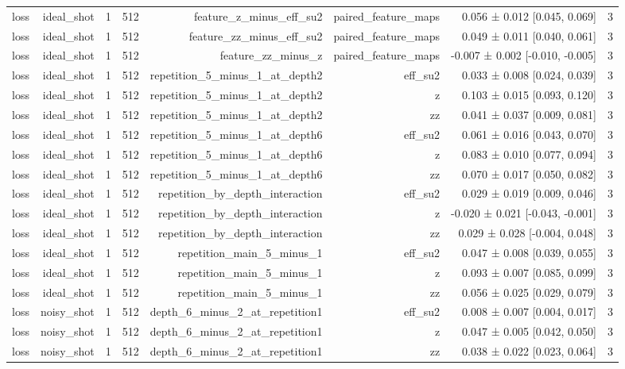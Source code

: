 \begin{table}
\begin{tabular}{lrrrrrrr}
loss & ideal\_shot & 1 & 512 & feature\_z\_minus\_eff\_su2 & paired\_feature\_maps & 0.056 ± 0.012 [0.045, 0.069] & 3 \\
loss & ideal\_shot & 1 & 512 & feature\_zz\_minus\_eff\_su2 & paired\_feature\_maps & 0.049 ± 0.011 [0.040, 0.061] & 3 \\
loss & ideal\_shot & 1 & 512 & feature\_zz\_minus\_z & paired\_feature\_maps & -0.007 ± 0.002 [-0.010, -0.005] & 3 \\
loss & ideal\_shot & 1 & 512 & repetition\_5\_minus\_1\_at\_depth2 & eff\_su2 & 0.033 ± 0.008 [0.024, 0.039] & 3 \\
loss & ideal\_shot & 1 & 512 & repetition\_5\_minus\_1\_at\_depth2 & z & 0.103 ± 0.015 [0.093, 0.120] & 3 \\
loss & ideal\_shot & 1 & 512 & repetition\_5\_minus\_1\_at\_depth2 & zz & 0.041 ± 0.037 [0.009, 0.081] & 3 \\
loss & ideal\_shot & 1 & 512 & repetition\_5\_minus\_1\_at\_depth6 & eff\_su2 & 0.061 ± 0.016 [0.043, 0.070] & 3 \\
loss & ideal\_shot & 1 & 512 & repetition\_5\_minus\_1\_at\_depth6 & z & 0.083 ± 0.010 [0.077, 0.094] & 3 \\
loss & ideal\_shot & 1 & 512 & repetition\_5\_minus\_1\_at\_depth6 & zz & 0.070 ± 0.017 [0.050, 0.082] & 3 \\
loss & ideal\_shot & 1 & 512 & repetition\_by\_depth\_interaction & eff\_su2 & 0.029 ± 0.019 [0.009, 0.046] & 3 \\
loss & ideal\_shot & 1 & 512 & repetition\_by\_depth\_interaction & z & -0.020 ± 0.021 [-0.043, -0.001] & 3 \\
loss & ideal\_shot & 1 & 512 & repetition\_by\_depth\_interaction & zz & 0.029 ± 0.028 [-0.004, 0.048] & 3 \\
loss & ideal\_shot & 1 & 512 & repetition\_main\_5\_minus\_1 & eff\_su2 & 0.047 ± 0.008 [0.039, 0.055] & 3 \\
loss & ideal\_shot & 1 & 512 & repetition\_main\_5\_minus\_1 & z & 0.093 ± 0.007 [0.085, 0.099] & 3 \\
loss & ideal\_shot & 1 & 512 & repetition\_main\_5\_minus\_1 & zz & 0.056 ± 0.025 [0.029, 0.079] & 3 \\
loss & noisy\_shot & 1 & 512 & depth\_6\_minus\_2\_at\_repetition1 & eff\_su2 & 0.008 ± 0.007 [0.004, 0.017] & 3 \\
loss & noisy\_shot & 1 & 512 & depth\_6\_minus\_2\_at\_repetition1 & z & 0.047 ± 0.005 [0.042, 0.050] & 3 \\
loss & noisy\_shot & 1 & 512 & depth\_6\_minus\_2\_at\_repetition1 & zz & 0.038 ± 0.022 [0.023, 0.064] & 3 \\

\end{tabular}
\end{table}
